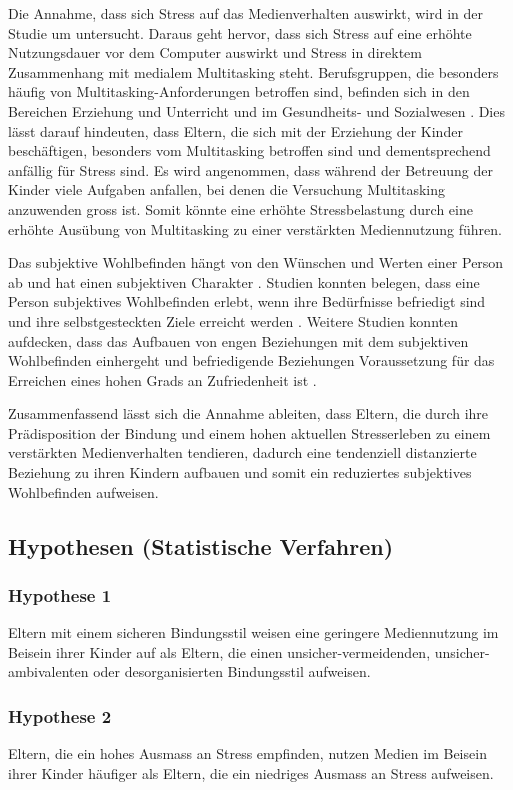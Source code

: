 Die Annahme, dass sich Stress auf das Medienverhalten auswirkt, wird in der Studie um  untersucht. Daraus geht hervor, dass sich Stress auf eine erhöhte Nutzungsdauer vor dem Computer auswirkt und Stress in direktem Zusammenhang mit medialem Multitasking steht. Berufsgruppen, die besonders häufig von Multitasking-Anforderungen betroffen sind, befinden sich in den Bereichen Erziehung und Unterricht und im Gesundheits- und Sozialwesen \cite{Lohmann2012}. Dies lässt darauf hindeuten, dass Eltern, die sich mit der Erziehung der Kinder beschäftigen, besonders vom Multitasking betroffen sind und dementsprechend anfällig für Stress sind. Es wird angenommen, dass während der Betreuung der Kinder viele Aufgaben anfallen, bei denen die Versuchung Multitasking anzuwenden gross ist. Somit könnte eine erhöhte Stressbelastung durch eine erhöhte Ausübung von Multitasking zu einer verstärkten Mediennutzung führen.

Das subjektive Wohlbefinden hängt von den Wünschen und Werten einer Person ab und hat einen subjektiven Charakter \cite{Odaci2014}. Studien konnten belegen, dass eine Person subjektives Wohlbefinden erlebt, wenn ihre Bedürfnisse befriedigt sind und ihre selbstgesteckten Ziele erreicht werden \cite{Diener1999}. Weitere Studien konnten aufdecken, dass das Aufbauen von engen Beziehungen mit dem subjektiven Wohlbefinden einhergeht \cite{Kasser1996} und befriedigende Beziehungen Voraussetzung für das Erreichen eines hohen Grads an Zufriedenheit ist \cite{Celik2013}.

Zusammenfassend lässt sich die Annahme ableiten, dass Eltern, die durch ihre Prädisposition der Bindung und einem hohen aktuellen Stresserleben zu einem verstärkten Medienverhalten tendieren, dadurch eine tendenziell distanzierte Beziehung zu ihren Kindern aufbauen und somit ein reduziertes subjektives Wohlbefinden aufweisen.

\subsection{Hypothesen (Statistische Verfahren)}
\subsubsection{Hypothese 1}
Eltern mit einem sicheren Bindungsstil weisen eine geringere Mediennutzung im Beisein ihrer Kinder auf als Eltern, die einen unsicher-vermeidenden, unsicher-ambivalenten oder desorganisierten Bindungsstil aufweisen.
\subsubsection{Hypothese 2}
Eltern, die ein hohes Ausmass an Stress empfinden, nutzen Medien im Beisein ihrer Kinder häufiger als Eltern, die ein niedriges Ausmass an Stress aufweisen.
